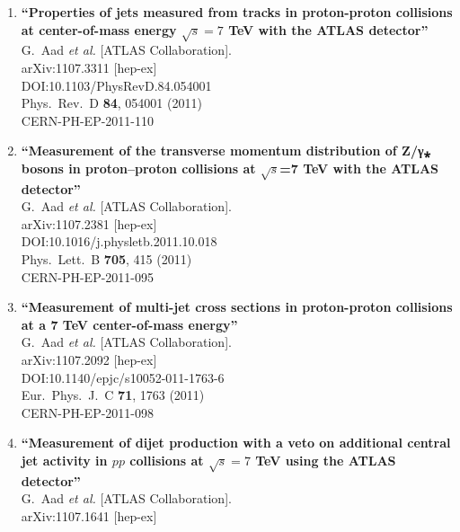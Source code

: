 \documentclass{article}
\begin{document}
\begin{enumerate}
\item%
{\bf ``Properties of jets measured from tracks in proton-proton collisions at center-of-mass energy $\sqrt{s}=7$ TeV with the ATLAS detector''}
  \\{}G.~Aad {\it et al.} [ATLAS Collaboration].
  \\{}arXiv:1107.3311 [hep-ex]
  \\{}DOI:10.1103/PhysRevD.84.054001
  \\{}Phys.\ Rev.\ D {\bf 84}, 054001 (2011)
  \\{}CERN-PH-EP-2011-110
\item%
{\bf ``Measurement of the transverse momentum distribution of Z/γ⁎ bosons in proton–proton collisions at $\sqrt{s}$=7 TeV with the ATLAS detector''}
  \\{}G.~Aad {\it et al.} [ATLAS Collaboration].
  \\{}arXiv:1107.2381 [hep-ex]
  \\{}DOI:10.1016/j.physletb.2011.10.018
  \\{}Phys.\ Lett.\ B {\bf 705}, 415 (2011)
  \\{}CERN-PH-EP-2011-095
\item%
{\bf ``Measurement of multi-jet cross sections in proton-proton collisions at a 7 TeV center-of-mass energy''}
  \\{}G.~Aad {\it et al.} [ATLAS Collaboration].
  \\{}arXiv:1107.2092 [hep-ex]
  \\{}DOI:10.1140/epjc/s10052-011-1763-6
  \\{}Eur.\ Phys.\ J.\ C {\bf 71}, 1763 (2011)
  \\{}CERN-PH-EP-2011-098
\item%
{\bf ``Measurement of dijet production with a veto on additional central jet activity in $pp$ collisions at $\sqrt{s}=7$ TeV using the ATLAS detector''}
  \\{}G.~Aad {\it et al.} [ATLAS Collaboration].
  \\{}arXiv:1107.1641 [hep-ex]

\end{enumerate}
\end{document}
